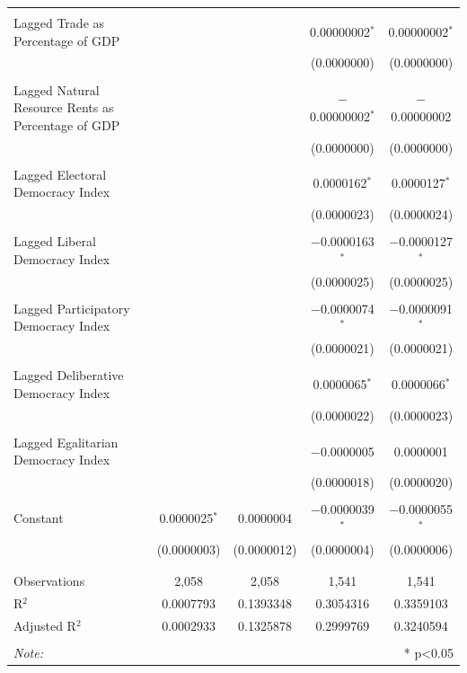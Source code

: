 \documentclass[11pt, titlepage]{article} %
\begin{document}
\begin{table}[!htbp]
\begin{tabular}{@{\extracolsep{5pt}}lcccc}
  & & & & \\ 
 Lagged Trade as Percentage of GDP &  &  & 0.00000002$^{*}$ & 0.00000002$^{*}$ \\ 
  &  &  & (0.0000000) & (0.0000000) \\ 
  & & & & \\ 
 Lagged Natural Resource Rents as Percentage of GDP &  &  & $-$0.00000002$^{*}$ & $-$0.00000002 \\ 
  &  &  & (0.0000000) & (0.0000000) \\ 
  & & & & \\ 
 Lagged Electoral Democracy Index &  &  & 0.0000162$^{*}$ & 0.0000127$^{*}$ \\ 
  &  &  & (0.0000023) & (0.0000024) \\ 
  & & & & \\ 
 Lagged Liberal Democracy Index &  &  & $-$0.0000163$^{*}$ & $-$0.0000127$^{*}$ \\ 
  &  &  & (0.0000025) & (0.0000025) \\ 
  & & & & \\ 
 Lagged Participatory Democracy Index &  &  & $-$0.0000074$^{*}$ & $-$0.0000091$^{*}$ \\ 
  &  &  & (0.0000021) & (0.0000021) \\ 
  & & & & \\ 
 Lagged Deliberative Democracy Index &  &  & 0.0000065$^{*}$ & 0.0000066$^{*}$ \\ 
  &  &  & (0.0000022) & (0.0000023) \\ 
  & & & & \\ 
 Lagged Egalitarian Democracy Index &  &  & $-$0.0000005 & 0.0000001 \\ 
  &  &  & (0.0000018) & (0.0000020) \\ 
  & & & & \\ 
 Constant & 0.0000025$^{*}$ & 0.0000004 & $-$0.0000039$^{*}$ & $-$0.0000055$^{*}$ \\ 
  & (0.0000003) & (0.0000012) & (0.0000004) & (0.0000006) \\ 
  & & & & \\ 
\hline \\[-1.8ex] 
Observations & 2,058 & 2,058 & 1,541 & 1,541 \\ 
R$^{2}$ & 0.0007793 & 0.1393348 & 0.3054316 & 0.3359103 \\ 
Adjusted R$^{2}$ & 0.0002933 & 0.1325878 & 0.2999769 & 0.3240594 \\ 
\hline 
\hline \\[-1.8ex] 
\textit{Note:}  & \multicolumn{4}{r}{* p<0.05} \\ 
\end{tabular} 
\end{table} 
\end{document}
